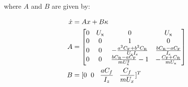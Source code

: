 \documentclass[11pt]{article}
\begin{document}
where $A$ and $B$ are given by:

\begin{subequations}
\label{eqn:Amatrix}
\begin{align}
    \dot{x} &= Ax + B\kappa  \\
	A  &=  \begin{bmatrix}
   0 & U_\mathrm{x} & 0 & U_\mathrm{x} \\ 
   0 & 0 & 1 & 0 \\ 
   0  & 0  & -\frac{a^2C_\mathrm{F}+b^2C_\mathrm{R}}{U_\mathrm{x}I_\mathrm{z}} & \frac{bC_\mathrm{R} - aC_\mathrm{F}}{I_\mathrm{z}}  \\
   0  & 0  & \frac{bC_\mathrm{R}-aC_\mathrm{F}}{mU_\mathrm{x}^2}-1 & -\frac{C_\mathrm{F} + C_\mathrm{R}}{mU_\mathrm{x}}
  \end{bmatrix} \\
	B  &=[0 \hspace{2 mm} 0 \hspace{3 mm} \frac{aC_f}{I_z} \hspace{3 mm} \frac{C_f}{mU_x}]^T
\end{align}
\end{subequations}
\end{document}
